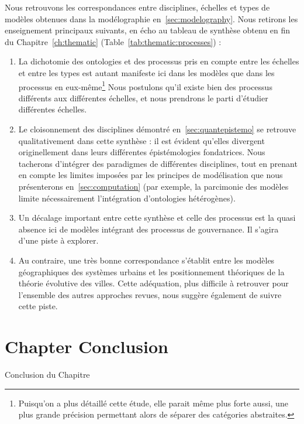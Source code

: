Nous retrouvons les correspondances entre disciplines, échelles et types de modèles obtenues dans la modélographie en~\ref{sec:modelography}. Nous retirons les enseignement principaux suivants, en écho au tableau de synthèse obtenu en fin du Chapitre~\ref{ch:thematic} (Table~\ref{tab:thematic:processes}) :
\begin{enumerate}
	\item La dichotomie des ontologies et des processus pris en compte entre les échelles et entre les types est autant manifeste ici dans les modèles que dans les processus en eux-même\footnote{Puisqu'on a plus détaillé cette étude, elle parait même plus forte aussi, une plus grande précision permettant alors de séparer des catégories abstraites.} Nous postulons qu'il existe bien des processus différents aux différentes échelles, et nous prendrons le parti d'étudier différentes échelles.
	\item Le cloisonnement des disciplines démontré en~\ref{sec:quantepistemo} se retrouve qualitativement dans cette synthèse : il est évident qu'elles divergent originellement dans leurs différentes épistémologies fondatrices. Nous tacherons d'intégrer des paradigmes de différentes disciplines, tout en prenant en compte les limites imposées par les principes de modélisation que nous présenterons en~\ref{sec:computation} (par exemple, la parcimonie des modèles limite nécessairement l'intégration d'ontologies hétérogènes).
	\item Un décalage important entre cette synthèse et celle des processus est la quasi absence ici de modèles intégrant des processus de gouvernance. Il s'agira d'une piste à explorer.
	\item Au contraire, une très bonne correspondance s'établit entre les modèles géographiques des systèmes urbains et les positionnement théoriques de la théorie évolutive des villes. Cette adéquation, plus difficile à retrouver pour l'ensemble des autres approches revues, nous suggère également de suivre cette piste.
\end{enumerate}







\newpage


\section*{Chapter Conclusion}{Conclusion du Chapitre}

